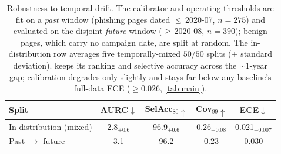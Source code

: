 \begin{table}[!h]
\caption{Robustness to temporal drift. The calibrator and operating thresholds are fit on a
\emph{past} window (phishing pages dated $\le$\,2020-07, $n{=}275$) and evaluated on the
disjoint \emph{future} window ($\ge$\,2020-08, $n{=}390$); benign pages, which carry no
campaign date, are split at random. The in-distribution row averages five temporally-mixed
$50/50$ splits ($\pm$ standard deviation). \toolname{} keeps its ranking and selective
accuracy across the $\sim$1-year gap; calibration degrades only slightly and stays far below
any baseline's full-data ECE ($\ge0.026$, \autoref{tab:main}).}
\label{tab:drift}
\footnotesize
\setlength{\tabcolsep}{5pt}
\begin{tabular}{lcccc}
\toprule
Split & AURC$\downarrow$ & SelAcc$_{80}\uparrow$ & Cov$_{99}\uparrow$ & ECE$\downarrow$ \\
\midrule
In-distribution (mixed)    & 2.8$_{\pm0.6}$ & 96.9$_{\pm0.6}$ & 0.26$_{\pm0.08}$ & 0.021$_{\pm0.007}$ \\
Past $\rightarrow$ future  & 3.1            & 96.2            & 0.23            & 0.030 \\
\bottomrule
\end{tabular}
\end{table}
